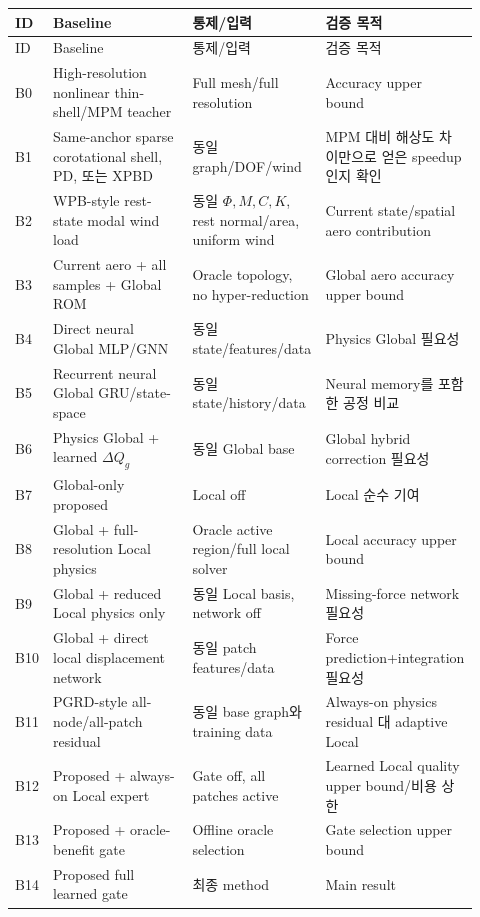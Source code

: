 \documentclass[11pt,a4paper]{article}
\begin{document}
\begin{longtable}{L{0.08\linewidth}L{0.30\linewidth}L{0.29\linewidth}L{0.25\linewidth}}
\toprule
ID & Baseline & 통제/입력 & 검증 목적 \\
\midrule
\endfirsthead
\toprule
ID & Baseline & 통제/입력 & 검증 목적 \\
\midrule
\endhead
B0 & High-resolution nonlinear thin-shell/MPM teacher & Full mesh/full resolution & Accuracy upper bound \\
\addlinespace
B1 & Same-anchor sparse corotational shell, PD, 또는 XPBD & 동일 graph/DOF/wind & MPM 대비 해상도 차이만으로 얻은 speedup인지 확인 \\
\addlinespace
B2 & WPB-style rest-state modal wind load & 동일 \(\Phi,M,C,K\), rest normal/area, uniform wind & Current state/spatial aero contribution \\
\addlinespace
B3 & Current aero + all samples + Global ROM & Oracle topology, no hyper-reduction & Global aero accuracy upper bound \\
\addlinespace
B4 & Direct neural Global MLP/GNN & 동일 state/features/data & Physics Global 필요성 \\
\addlinespace
B5 & Recurrent neural Global GRU/state-space & 동일 state/history/data & Neural memory를 포함한 공정 비교 \\
\addlinespace
B6 & Physics Global + learned \(\Delta Q_g\) & 동일 Global base & Global hybrid correction 필요성 \\
\addlinespace
B7 & Global-only proposed & Local off & Local 순수 기여 \\
\addlinespace
B8 & Global + full-resolution Local physics & Oracle active region/full local solver & Local accuracy upper bound \\
\addlinespace
B9 & Global + reduced Local physics only & 동일 Local basis, network off & Missing-force network 필요성 \\
\addlinespace
B10 & Global + direct local displacement network & 동일 patch features/data & Force prediction+integration 필요성 \\
\addlinespace
B11 & PGRD-style all-node/all-patch residual & 동일 base graph와 training data & Always-on physics residual 대 adaptive Local \\
\addlinespace
B12 & Proposed + always-on Local expert & Gate off, all patches active & Learned Local quality upper bound/비용 상한 \\
\addlinespace
B13 & Proposed + oracle-benefit gate & Offline oracle selection & Gate selection upper bound \\
\addlinespace
B14 & Proposed full learned gate & 최종 method & Main result \\
\bottomrule
\end{longtable}
\end{document}
